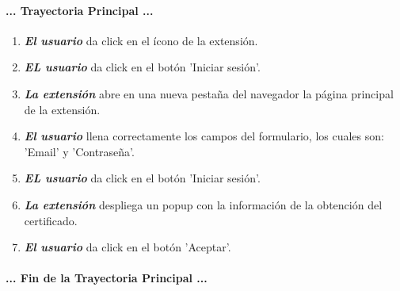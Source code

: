 \documentclass[12pt, a4paper, titlepage]{report}
\begin{document}
				\paragraph{... Trayectoria Principal ...}
				\begin{enumerate}
					
					\item \textbf{\textit{El usuario}} da click en el ícono de la extensión.
					
					\item \textbf{\textit{EL usuario}} da click en el botón 'Iniciar sesión'.
					
					\item \textbf{\textit{La extensión}} abre en una nueva pestaña del navegador la página principal de la extensión.
					
					\item \textbf{\textit{El usuario}} llena correctamente los campos del formulario, los cuales son: 'Email' y 'Contraseña'.
					
					\item \textbf{\textit{EL usuario}} da click en el botón 'Iniciar sesión'.
					
					\item \textbf{\textit{La extensión}} despliega un popup con la información de la obtención del certificado.
					
					\item \textbf{\textit{El usuario}} da click en el botón 'Aceptar'.
				
				\end{enumerate}
				\paragraph{... Fin de la Trayectoria Principal ...}
				
				
\end{document}
